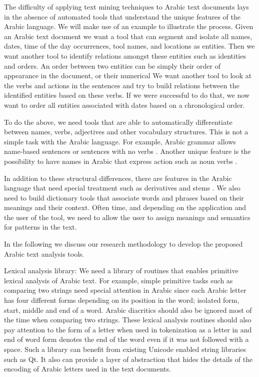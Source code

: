\documentclass[12pt]{article}
\newcommand{\noTrNoVocRL}[1]{\novocalize\transfalse\RL{#1}\transtrue\vocalize}
\begin{document}
The difficulty of applying text mining techniques to Arabic text 
documents lays in the absence of automated tools that understand 
the unique features of the Arabic language.
We will make use of an example to illustrate the process.
Given an Arabic text document we want a tool that can segment 
and isolate all names, dates, time of the day occurrences,
tool names, and locations as entities.
Then we want another tool to identify relations amongst 
these entities such as identities and orders.
An order between two entities can be simply 
their order of appearance in the document, or their
numerical 
 We want another tool to look at the verbs and actions in the sentences and try to build relations between the identified entities based on these verbs.
 If we were successful to do that,
 we now want to order all entities associated with dates based on a chronological order.

To do the above,
 we need tools that are able to automatically differentiate between names,
 verbs,
 adjectives and other vocabulary structures.
 This is not a simple task with the Arabic language.
 For example,
 Arabic grammar allows name-based sentences or sentences with no 
    verbs \noTrNoVocRL{^gml ismiyT} .
 Another unique feature is the possibility to have names in Arabic 
 that express action such as noun verbs 
 \noTrNoVocRL{ism f`l, f-a`l $\ldots$}.

 In addition to these structural differences,
 there are features in the Arabic language that need special 
 treatment such as derivatives and stems 
 \noTrNoVocRL{alm^staq-at w al^g_dwr}.
 We also need to build dictionary tools that associate words and phrases based on their meanings and their context.
 Often time,
 and depending on the application and the user of the tool,
 we need to allow the user to assign meanings and semantics for patterns in the text.

In the following we discuss our research methodology to develop the proposed Arabic text analysis tools.
 
Lexical analysis library: We need a library of routines that enables primitive lexical analysis of Arabic text.
 For example,
 simple primitive tasks such as comparing two strings need special attention in Arabic since each Arabic letter has four different forms depending on its position in the word; isolated form,
 start,
 middle and end of a word.
 Arabic diacritics should also be ignored most of the time when comparing two strings.
 These lexical analysis routines should also pay attention to the form of a letter when used in tokenization as a letter in and end of word form denotes the end of the word even if it was not followed with a space.
 Such a library can benefit from existing Unicode enabled string libraries such as Qt.
 It also can provide a layer of abstraction that hides the details of the encoding of Arabic letters used in the text documents.
 
\end{document}
